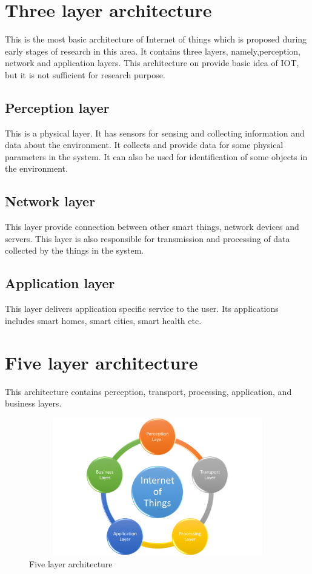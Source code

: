 \documentclass[12pt, a4paper]{report}
\begin{document}
\section{Three layer architecture}
This is the most basic architecture of Internet of things which is proposed during early stages of research in this area. It contains three layers, namely,perception, network and application layers. This architecture on provide basic idea of IOT, but it is not sufficient for research purpose.
\subsection{Perception layer}
This is a physical layer. It has sensors for sensing and collecting information and data about the environment. It collects and provide data for some physical parameters in the system. It can also be used for identification of some objects in the environment.
\subsection{Network layer}
This layer provide connection between other smart things, network devices and servers. This layer is also responsible for transmission and processing of data collected by the things in the system.
\subsection{Application layer}
This layer delivers application specific service to the user. Its applications includes smart homes, smart cities, smart health etc.

\section{Five layer architecture}
This architecture contains perception, transport, processing, application, and business layers.
\begin{figure}[h]
\centering
\includegraphics[width=12cm, height=6cm]{Picture2}
\caption{Five layer architecture}
\label{figure-4}
\end{figure}
\end{document}
